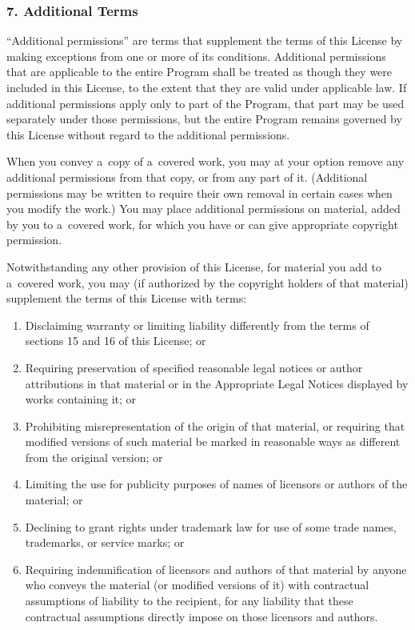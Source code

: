 \documentclass[a4paper, 11pt, twoside]{article}
\begin{document}
\subsubsection{7. Additional Terms}

“Additional permissions” are terms that supplement the terms of this License by making exceptions from one or more of its conditions. Additional permissions that are applicable to the entire Program shall be treated as though they were included in this License, to the extent that they are valid under applicable law. If additional permissions apply only to part of the Program, that part may be used separately under those permissions, but the entire Program remains governed by this License without regard to the additional permissions.

When you convey a~copy of a~covered work, you may at your option remove any additional permissions from that copy, or from any part of it. (Additional permissions may be written to require their own removal in certain cases when you modify the work.) You may place additional permissions on material, added by you to a~covered work, for which you have or can give appropriate copyright permission.

Notwithstanding any other provision of this License, for material you add to a~covered work, you may (if authorized by the copyright holders of that material) supplement the terms of this License with terms:

\begin{enumerate}[label=\Alph*)]
\item Disclaiming warranty or limiting liability differently from the terms of sections 15 and 16 of this License; or
\item Requiring preservation of specified reasonable legal notices or author attributions in that material or in the Appropriate Legal Notices displayed by works containing it; or
\item Prohibiting misrepresentation of the origin of that material, or requiring that modified versions of such material be marked in reasonable ways as different from the original version; or
\item Limiting the use for publicity purposes of names of licensors or authors of the material; or
\item Declining to grant rights under trademark law for use of some trade names, trademarks, or service marks; or 
\item Requiring indemnification of licensors and authors of that material by anyone who conveys the material (or modified versions of it) with contractual assumptions of liability to the recipient, for any liability that these contractual assumptions directly impose on those licensors and authors.
\end{enumerate}
\end{document}
